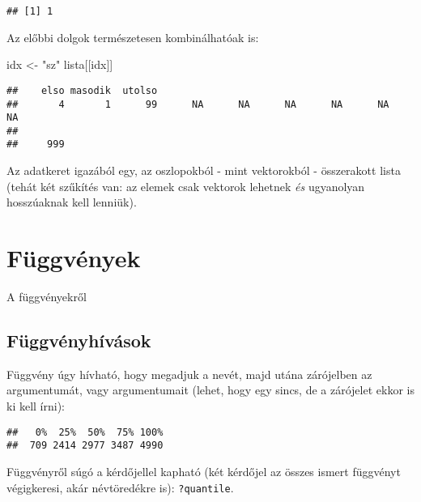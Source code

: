 \documentclass[]{book}
\newenvironment{Shaded}{\begin{snugshade}}{\end{snugshade}}
\newcommand{\KeywordTok}[1]{\textcolor[rgb]{0.13,0.29,0.53}{\textbf{#1}}}
\newcommand{\StringTok}[1]{\textcolor[rgb]{0.31,0.60,0.02}{#1}}
\newcommand{\OperatorTok}[1]{\textcolor[rgb]{0.81,0.36,0.00}{\textbf{#1}}}
\newcommand{\NormalTok}[1]{#1}
\begin{document}
\begin{verbatim}
## [1] 1
\end{verbatim}

Az előbbi dolgok természetesen kombinálhatóak is:

\begin{Shaded}
\begin{Highlighting}[]
\NormalTok{idx <-}\StringTok{ "sz"}
\NormalTok{lista[[idx]]}
\end{Highlighting}
\end{Shaded}

\begin{verbatim}
##    elso masodik  utolso                                                 
##       4       1      99      NA      NA      NA      NA      NA      NA 
##         
##     999
\end{verbatim}

Az adatkeret igazából egy, az oszlopokból - mint vektorokból -
összerakott lista (tehát két szűkítés van: az elemek csak vektorok
lehetnek \emph{és} ugyanolyan hosszúaknak kell lenniük).

\chapter{Függvények}\label{fuggvenyek}

A függvényekről

\section{Függvényhívások}\label{fuggvenyhivasok}

Függvény úgy hívható, hogy megadjuk a nevét, majd utána zárójelben az
argumentumát, vagy argumentumait (lehet, hogy egy sincs, de a zárójelet
ekkor is ki kell írni):

\begin{Shaded}
\end{Shaded}

\begin{verbatim}
##   0%  25%  50%  75% 100% 
##  709 2414 2977 3487 4990
\end{verbatim}

Függvényről súgó a kérdőjellel kapható (két kérdőjel az összes ismert
függvényt végigkeresi, akár névtöredékre is): \texttt{?quantile}.
\end{document}
